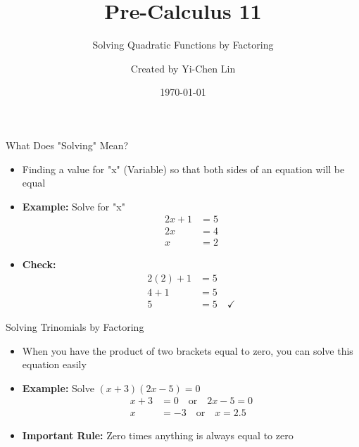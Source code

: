 \documentclass[aspectratio=169]{beamer}
\title{Pre-Calculus 11}
\subtitle{Solving Quadratic Functions by Factoring}
\author{Created by Yi-Chen Lin}
\date{\today}
\begin{document}
\begin{frame}
    \titlepage
\end{frame}

\begin{frame}{What Does "Solving" Mean?}
    \begin{tcolorbox}[colback=lightgray,colframe=primary,title=Definition]
        \footnotesize
        \begin{itemize}
            \item Finding a value for "x" (Variable) so that both sides of an equation will be equal
            \item \textbf{Example:} Solve for "x"
            \begin{align*}
                2x + 1 &= 5 \\
                2x &= 4 \\
                x &= 2
            \end{align*}
            \item \textbf{Check:}
            \begin{align*}
                2(2) + 1 &= 5 \\
                4 + 1 &= 5 \\
                5 &= 5 \quad \checkmark
            \end{align*}
        \end{itemize}
    \end{tcolorbox}
\end{frame}

\begin{frame}{Solving Trinomials by Factoring}
    \begin{tcolorbox}[colback=lightgray,colframe=primary,title=Key Concept]
        \footnotesize
        \begin{itemize}
            \item When you have the product of two brackets equal to zero, you can solve this equation easily
            \item \textbf{Example:} Solve $(x + 3)(2x - 5) = 0$
            \begin{align*}
                x + 3 &= 0 \quad \text{or} \quad 2x - 5 = 0 \\
                x &= -3 \quad \text{or} \quad x = 2.5
            \end{align*}
            \item \textcolor{accent}{\textbf{Important Rule:}} Zero times anything is always equal to zero
        \end{itemize}
    \end{tcolorbox}
\end{frame}
\end{document}
